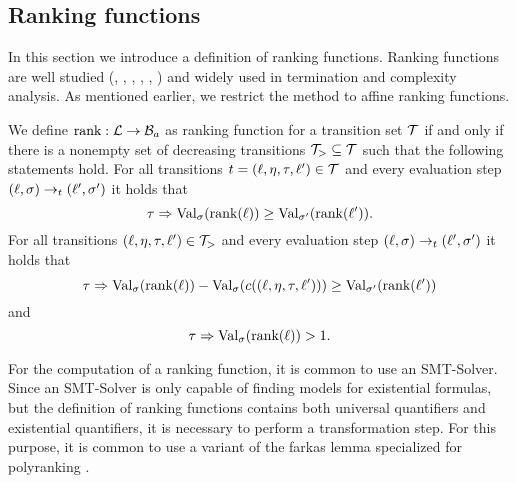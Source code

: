 \subsection{Ranking functions}

In this section we introduce a definition of ranking functions.
Ranking functions are well studied (\cite{bradley2005polyranking}, \cite{podelski2004prf}, \cite{bradley2005linear}, \cite{bagnara2012new}, \cite{leike2014ranking}, \cite{ben2013linear}) and widely used in termination and complexity analysis.
As mentioned earlier, we restrict the method to affine ranking functions.

\begin{definition} 
	We define $\Pol: \LSet \rightarrow \BoundSet_a$ as ranking function for a transition set $\TSet$ if and only if there is a nonempty set of decreasing transitions $\TSet_{>} \subseteq \TSet$ such that the following statements hold.
        For all transitions $t = (\location, \update, \guard, \location') \in \TSet$ and every evaluation step $(\location, \valuation) \rightarrow_t (\location', \valuation')$ it holds that
	\[ \guard \Rightarrow \exacteval{\Pol(\location)}{\valuation} \geq \exacteval{\Pol(\location')}{\valuation'}. \]
        For all transitions $(\location, \update, \guard, \location') \in \TSet_{>}$ and every evaluation step $(\location, \valuation) \rightarrow_t (\location', \valuation')$ it holds that        
	\[ \guard \Rightarrow \exacteval{\Pol(\location)}{\valuation} - \exacteval{\cost((\location, \update, \guard, \location'))}{\valuation} \geq \exacteval{\Pol(\location')}{\valuation'} \]
        and
	\[ \guard \Rightarrow \exacteval{\Pol(\location)}{\valuation} > 1. \]
\end{definition}


For the computation of a ranking function, it is common to use an SMT-Solver.
Since an SMT-Solver is only capable of finding models for existential formulas, but the definition of ranking functions contains both universal quantifiers and existential quantifiers, it is necessary to perform a transformation step.
For this purpose, it is common to use a variant of the farkas lemma \cite{schrijver1998theory} specialized for polyranking \cite{bradley2005polyranking}.

